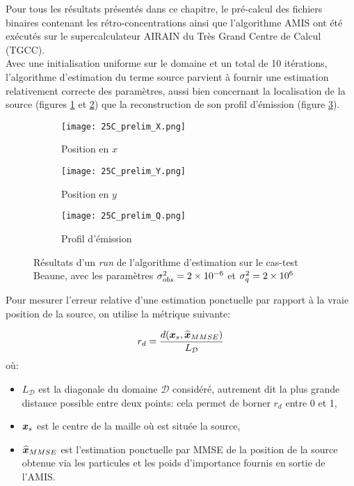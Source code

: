 Pour tous les résultats présentés dans ce chapitre, le pré-calcul des fichiers binaires contenant les rétro-concentrations ainsi que l'algorithme AMIS ont été exécutés sur le supercalculateur AIRAIN du Très Grand Centre de Calcul (TGCC). \\

Avec une initialisation uniforme sur le domaine et un total de 10 itérations, l'algorithme d'estimation du terme source parvient à fournir une estimation relativement correcte des paramètres, aussi bien concernant la localisation de la source (figures \ref{fig_25C_prelim_X} et \ref{fig_25C_prelim_Y}) que la reconstruction de son profil d'émission (figure \ref{fig_25C_prelim_Q}).\\

 \begin{figure}[h!]
 	\centering
 	\begin{subfigure}[t]{0.5\textwidth}
 		\centering
 		\texttt{[image: 25C\_prelim\_X.png]}
 		\caption{Position en $x$}
 		\label{fig_25C_prelim_X}
 	\end{subfigure}%
 	\begin{subfigure}[t]{0.5\textwidth}
 		\centering
 		\texttt{[image: 25C\_prelim\_Y.png]}
 		\caption{Position en $y$}
 		\label{fig_25C_prelim_Y}
 	\end{subfigure}
 	\begin{subfigure}[t]{0.65\textwidth}
 		\centering
 		\texttt{[image: 25C\_prelim\_Q.png]}
 		\caption{Profil d'émission}
 		\label{fig_25C_prelim_Q}
 	\end{subfigure} 
 	\caption{Résultats d'un \textit{run} de l'algorithme d'estimation sur le cas-test Beaune, avec les paramètres ${\sigma_{obs}^2}=2\times 10^{-6}$ et $\sigma_q^2=2\times 10^6$}
 	\label{fig_25C_prelim}
 \end{figure}
 
 Pour mesurer l'erreur relative d'une estimation ponctuelle par rapport à la vraie position de la source, on utilise la métrique suivante:
 
 \begin{equation}
	 r_d = \dfrac{d({\bm{x}}_s,\widehat{{\bm{x}}}_{MMSE})}{L_{\mathcal{D}}}
 \end{equation}
 où:
 \begin{itemize}
 	\item $L_{\mathcal{D}}$ est la diagonale du domaine $\mathcal{D}$ considéré, autrement dit la plus grande distance possible entre deux points: cela permet de borner $r_d$ entre 0 et 1,
 	\item ${\bm{x}}_s$ est le centre de la maille où est située la source,
 	\item $\widehat{{\bm{x}}} _{MMSE}$ est l'estimation ponctuelle par MMSE de la position de la source obtenue via les particules et les poids d'importance fournis en sortie de l'AMIS.
 \end{itemize}
 
